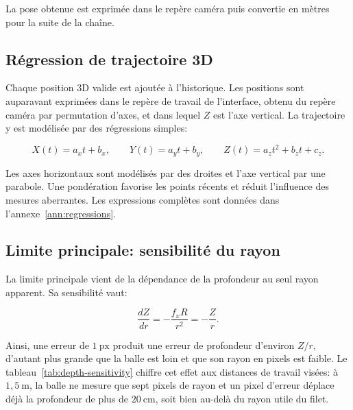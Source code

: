 \documentclass[a4paper,11pt]{report}
\begin{document}
La pose obtenue est exprimée dans le repère caméra puis convertie en mètres pour
la suite de la chaîne.

\subsection{Régression de trajectoire 3D}
\label{sec:regression-3d}

Chaque position 3D valide est ajoutée à l'historique. Les positions sont auparavant exprimées dans le repère de travail de l'interface, obtenu du repère caméra par permutation d'axes, et dans lequel \(Z\) est l'axe vertical. La trajectoire y est modélisée par des régressions simples:

\begin{equation}
X(t) = a_x t + b_x,
\qquad
Y(t) = a_y t + b_y,
\qquad
Z(t) = a_z t^2 + b_z t + c_z.
\label{eq:modele-trajectoire}
\end{equation}

Les axes horizontaux sont modélisés par des droites et l'axe vertical par une
parabole. Une pondération favorise les points récents et réduit l'influence des
mesures aberrantes. Les expressions complètes sont données dans
l'annexe~\ref{ann:regressions}.

\subsection{Limite principale: sensibilité du rayon}

La limite principale vient de la dépendance de la profondeur au seul rayon
apparent. Sa sensibilité vaut:

\begin{equation}
\frac{dZ}{dr} = -\frac{f_x R}{r^2} = -\frac{Z}{r}.
\label{eq:sensibilite-rayon}
\end{equation}

Ainsi, une erreur de \(1~\text{px}\) produit une erreur de profondeur d'environ
\(Z/r\), d'autant plus grande que la balle est loin et que son rayon en pixels
est faible. Le tableau~\ref{tab:depth-sensitivity} chiffre cet effet aux
distances de travail visées: à \(1{,}5~\text{m}\), la balle ne mesure que
sept pixels de rayon et un pixel d'erreur déplace déjà la profondeur de plus de
\(20~\text{cm}\), soit bien au-delà du rayon utile du filet.
\end{document}
